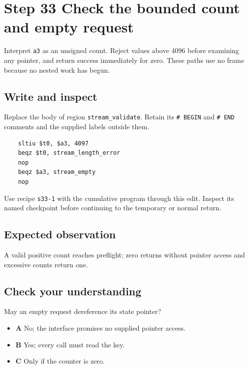 \section{Step 33 Check the bounded count and empty request}\label{chacha-s33}

Interpret \texttt{a3} as an unsigned count. Reject values above 4096 before examining any pointer, and return success immediately for zero. These paths use no frame because no nested work has begun.

\subsection{Write and inspect}
Replace the body of region \texttt{stream\_validate}. Retain its \texttt{\# BEGIN} and \texttt{\# END} comments and the supplied labels outside them.

\begin{verbatim}
    sltiu $t0, $a3, 4097
    beqz $t0, stream_length_error
    nop
    beqz $a3, stream_empty
    nop
\end{verbatim}

Use recipe \texttt{s33-1} with the cumulative program through this edit. Inspect its named checkpoint before continuing to the temporary or normal return.

\subsection{Expected observation}
A valid positive count reaches preflight; zero returns without pointer access and excessive counts return one.

\subsection{Check your understanding}
May an empty request dereference its state pointer?

\begin{itemize}
  \item \textbf{A} No; the interface promises no supplied pointer access.
  \item \textbf{B} Yes; every call must read the key.
  \item \textbf{C} Only if the counter is zero.
\end{itemize}
